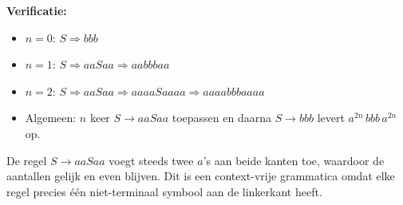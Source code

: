 \documentclass[11pt]{article}
\begin{document}
\begin{enumerate}
\begin{enumerate}
\textbf{Verificatie:}
\begin{itemize}
\item $n = 0$: $S \Rightarrow bbb$ \checkmark
\item $n = 1$: $S \Rightarrow aaSaa \Rightarrow aabbbaa$ \checkmark
\item $n = 2$: $S \Rightarrow aaSaa \Rightarrow aaaaSaaaa \Rightarrow aaaabbbaaaa$ \checkmark
\item Algemeen: $n$ keer $S \to aaSaa$ toepassen en daarna $S \to bbb$ levert $a^{2n}\,bbb\,a^{2n}$ op. \checkmark
\end{itemize}

De regel $S \to aaSaa$ voegt steeds twee $a$'s aan beide kanten toe, waardoor de aantallen gelijk en even blijven. Dit is een context-vrije grammatica omdat elke regel precies \'e\'en niet-terminaal symbool aan de linkerkant heeft.

\end{enumerate}

\end{enumerate}

\end{document}
